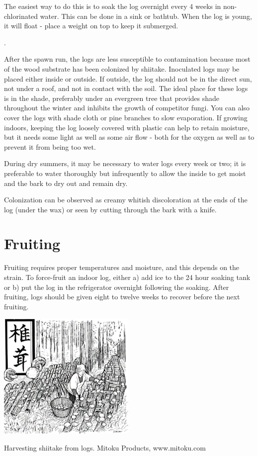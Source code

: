 \documentclass{tufte-handout}
\begin{document}
The easiest way to do this is to soak the log overnight every 4 weeks in non-chlorinated water. 
This can be done in a sink or bathtub.
When the log is young, it will float - place a weight on top to keep it submerged.


.

After the spawn run, the logs are less susceptible to contamination because most of the wood substrate has been colonized by shiitake.
Inoculated logs may be placed either inside or outside.
If outside, the log should not be in the direct sun, not under a roof, and not in contact with the soil.
The ideal place for these logs is in the shade, preferably under an evergreen tree that provides shade throughout the winter and inhibits the growth of competitor fungi.
You can also cover the logs with shade cloth or pine branches to slow evaporation.
If growing indoors, keeping the log loosely covered with plastic can help to retain moisture, but it needs some light as well as some air flow - both for the oxygen as well as to prevent it from being too wet.

During dry summers, it may be necessary to water logs every week or two; it is preferable to water thoroughly but infrequently to allow the inside to get moist and the bark to dry out and remain dry. 

Colonization can be observed as creamy whitish discoloration at the ends of the log (under the wax) or seen by cutting through the bark with a knife.

\section{Fruiting}

Fruiting requires proper temperatures and moisture, and this depends on the strain.
To force-fruit an indoor log, either a) add ice to the 24 hour soaking tank or b) put the log in the refrigerator overnight following the soaking.
After fruiting, logs should be given eight to twelve weeks to recover before the next fruiting. 

\begin{marginfigure}
\includegraphics{shiitake-harvest}
\caption{Harvesting shiitake from logs. Mitoku Products, www.mitoku.com}
\end{marginfigure}
\end{document}
